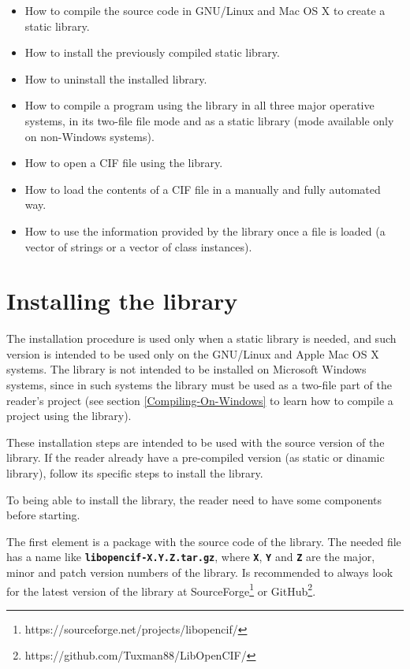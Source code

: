 \documentclass[11pt,twoside,openany,x11names,svgnames]{memoir}
\begin{document}
\begin{itemize}
	\item How to compile the source code in GNU/Linux and Mac OS X to create a static library.
	
	\item How to install the previously compiled static library.
	
	\item How to uninstall the installed library.
	
	\item How to compile a program using the library in all three major operative systems, in its two-file file mode and as a static library (mode available only on non-Windows systems).
	
	\item How to open a CIF file using the library.
	
	\item How to load the contents of a CIF file in a manually and fully automated way.
	
	\item How to use the information provided by the library once a file is loaded (a vector of strings or a vector of class instances).
\end{itemize}
\newpage 

\section{Installing the library}\label{Installing-The-Library}

The installation procedure is used only when a static library is needed, and such version is intended to be used only on the GNU/Linux and Apple Mac OS X systems. The library  is not intended to be installed on Microsoft Windows systems, since in such systems the library must be used as a two-file part of the reader's project (see section \ref{Compiling-On-Windows} to learn how to compile a project using the library).

These installation steps are intended to be used with the source version of the library. If the reader already have a pre-compiled version (as static or dinamic library), follow its specific steps to install the library.

To being able to install the library, the reader need to have some components before starting.

The first element is a package with the source code of the library. The needed file has a name like \textbf{\texttt{libopencif-X.Y.Z.tar.gz}}, where \textbf{\texttt{X}}, \textbf{\texttt{Y}} and \textbf{\texttt{Z}} are the major, minor and patch version numbers of the library. Is recommended to always look for the latest version of the library at SourceForge\footnote{https://sourceforge.net/projects/libopencif/} or GitHub\footnote{https://github.com/Tuxman88/LibOpenCIF/}.
\end{document}
